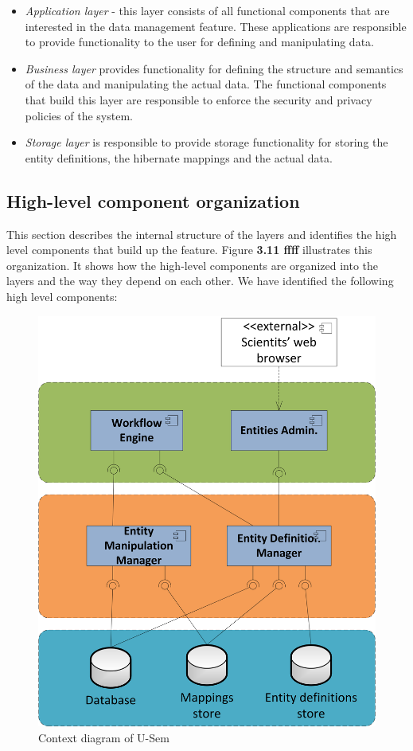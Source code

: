 \documentclass[a4paper, notitlepage]{article}
\begin{document}
\begin{itemize}
	\item \textit{Application layer} - this layer consists of all functional components that are interested in the data management feature. These applications are responsible to provide functionality to the user for defining and manipulating data.
	
	\item \textit{Business layer} provides functionality for defining the structure and semantics of the data and manipulating the actual data. The functional components that build this layer are responsible to enforce the security and privacy policies of the system.
	
	\item \textit{Storage layer } is responsible to provide storage functionality for storing the entity definitions, the hibernate mappings and the actual data.
\end{itemize}

\subsection{High-level component organization}
This section describes the internal structure of the layers and identifies the high level components that build up the feature. Figure \textbf{3.11 ffff} illustrates this organization. It shows how the high-level components are organized into the layers and the way they depend on each other. We have identified the following high level components:

\begin{figure}[h!]
  \centering
  	\includegraphics[scale=0.6]{functional/func_main.png}
  \caption{Context diagram of U-Sem }
  \label{fig_context}
\end{figure}
\end{document}
